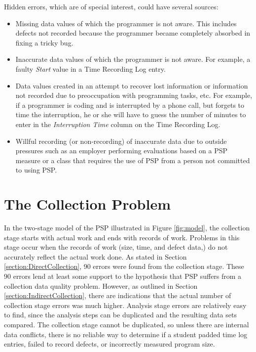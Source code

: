 Hidden errors, which are of special interest, could have several sources:
\begin{itemize}
\item Missing data values of which the programmer is not aware. This
  includes defects not recorded because the programmer became completely
  absorbed in fixing a tricky bug.
\item Inaccurate data values of which the programmer is not aware.  For
  example, a faulty {\it Start} value in a Time Recording Log entry.
\item Data values created in an attempt to recover lost information or
  information not recorded due to preoccupation with programming tasks,
  etc.  For example, if a programmer is coding and is interrupted by a
  phone call, but forgets to time the interruption, he or she will have to
  guess the number of minutes to enter in the {\it Interruption Time}
  column on the Time Recording Log.
\item Willful recording (or non-recording) of inaccurate data due to
  outside pressures such as an employer performing evaluations based on a
  PSP measure or a class that requires the use of PSP from a person not
  committed to using PSP.
\end{itemize}

\section{The Collection Problem}

In the two-stage model of the PSP illustrated in Figure \ref{fig:model},
the collection stage starts with actual work and ends with records of work.
Problems in this stage occur when the records of work (size, time, and
defect data,) do not accurately reflect the actual work done. As stated in
Section \ref{section:DirectCollection}, 90 errors were found from the
collection stage.  These 90 errors lend at least some support to the
hypothesis that PSP suffers from a collection data quality problem.
However, as outlined in Section \ref{section:IndirectCollection}, there are
indications that the actual number of collection stage errors was much
higher.  Analysis stage errors are relatively easy to find, since the
analysis steps can be duplicated and the resulting data sets compared.  The
collection stage cannot be duplicated, so unless there are internal data
conflicts, there is no reliable way to determine if a student padded time
log entries, failed to record defects, or incorrectly measured program
size.  

